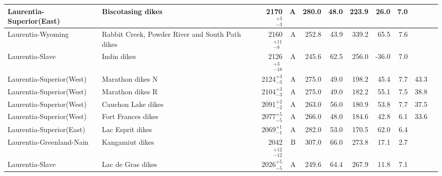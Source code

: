 \documentclass[twocolumn, switch]{article} %
\begin{document}
{\begin{landscape}
\begin{ThreePartTable}
\begin{longtable}{p{1.4 in}p{1.2 in}rrrrrrrrp{1.2 in}}
      Laurentia-Superior(East) &                                  Biscotasing dikes &     2170$^{+3}_{-3}$ &      A &     280.0 &      48.0 & 223.9 &  26.0 &       7.0 &          &                                  \cite{Evans2010a} \\ \hline
             Laurentia-Wyoming &    Rabbit Creek, Powder River and South Path dikes &    2160$^{+11}_{-8}$ &      A &     252.8 &      43.9 & 339.2 &  65.5 &       7.6 &          &                                 \cite{Kilian2015a} \\ \hline
               Laurentia-Slave &                                        Indin dikes &    2126$^{+3}_{-18}$ &      A &     245.6 &      62.5 & 256.0 & -36.0 &       7.0 &          &                                 \cite{Buchan2016a} \\ \hline
      Laurentia-Superior(West) &                                   Marathon dikes N &     2124$^{+3}_{-3}$ &      A &     275.0 &      49.0 & 198.2 &  45.4 &       7.7 &        43.3 &                                  \cite{Halls2008a} \\ \hline
      Laurentia-Superior(West) &                                   Marathon dikes R &     2104$^{+3}_{-3}$ &      A &     275.0 &      49.0 & 182.2 &  55.1 &       7.5 &        38.8 &                                  \cite{Halls2008a} \\ \hline
      Laurentia-Superior(West) &                                 Cauchon Lake dikes &     2091$^{+2}_{-2}$ &      A &     263.0 &      56.0 & 180.9 &  53.8 &       7.7 &        37.5 &                                  \cite{Evans2010a} \\ \hline
      Laurentia-Superior(West) &                                 Fort Frances dikes &     2077$^{+5}_{-5}$ &      A &     266.0 &      48.0 & 184.6 &  42.8 &       6.1 &        33.6 &                                  \cite{Evans2010a} \\ \hline
      Laurentia-Superior(East) &                                   Lac Esprit dikes &     2069$^{+1}_{-1}$ &      A &     282.0 &      53.0 & 170.5 &  62.0 &       6.4 &          &                                  \cite{Evans2010a} \\ \hline
      Laurentia-Greenland-Nain &                                    Kangamiut dikes &   2042$^{+12}_{-12}$ &      B &     307.0 &      66.0 & 273.8 &  17.1 &       2.7 &         &                                 \cite{Fahrig1976b} \\ \hline
               Laurentia-Slave &                                  Lac de Gras dikes &     2026$^{+5}_{-5}$ &      A &     249.6 &      64.4 & 267.9 &  11.8 &       7.1 &          &                                 \cite{Buchan2009a} \\ \hline

\end{longtable}
\end{ThreePartTable}
\end{landscape}}
\end{document}
